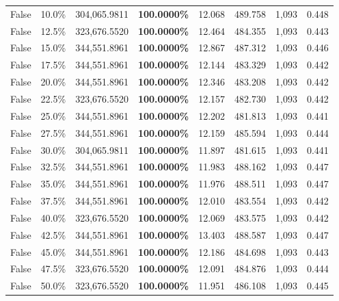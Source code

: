 \begin{table}[H]
\begin{tabular}{lllrllll}
False & 10.0\% & \color{red} 304,065.9811 & \bfseries \color{red} 100.0000\% & 12.068 & 489.758 & 1,093 & 0.448 \\
\cline{1-8}
False & 12.5\% & 323,676.5520 & \bfseries \color{red} 100.0000\% & 12.464 & 484.355 & 1,093 & 0.443 \\
\cline{1-8}
False & 15.0\% & 344,551.8961 & \bfseries \color{red} 100.0000\% & 12.867 & 487.312 & 1,093 & 0.446 \\
\cline{1-8}
False & 17.5\% & 344,551.8961 & \bfseries \color{red} 100.0000\% & 12.144 & 483.329 & 1,093 & 0.442 \\
\cline{1-8}
False & 20.0\% & 344,551.8961 & \bfseries \color{red} 100.0000\% & 12.346 & 483.208 & 1,093 & 0.442 \\
\cline{1-8}
False & 22.5\% & 323,676.5520 & \bfseries \color{red} 100.0000\% & 12.157 & 482.730 & 1,093 & 0.442 \\
\cline{1-8}
False & 25.0\% & 344,551.8961 & \bfseries \color{red} 100.0000\% & 12.202 & 481.813 & 1,093 & 0.441 \\
\cline{1-8}
False & 27.5\% & 344,551.8961 & \bfseries \color{red} 100.0000\% & 12.159 & 485.594 & 1,093 & 0.444 \\
\cline{1-8}
False & 30.0\% & \color{red} 304,065.9811 & \bfseries \color{red} 100.0000\% & 11.897 & 481.615 & 1,093 & 0.441 \\
\cline{1-8}
False & 32.5\% & 344,551.8961 & \bfseries \color{red} 100.0000\% & 11.983 & 488.162 & 1,093 & 0.447 \\
\cline{1-8}
False & 35.0\% & 344,551.8961 & \bfseries \color{red} 100.0000\% & 11.976 & 488.511 & 1,093 & 0.447 \\
\cline{1-8}
False & 37.5\% & 344,551.8961 & \bfseries \color{red} 100.0000\% & 12.010 & 483.554 & 1,093 & 0.442 \\
\cline{1-8}
False & 40.0\% & 323,676.5520 & \bfseries \color{red} 100.0000\% & 12.069 & 483.575 & 1,093 & 0.442 \\
\cline{1-8}
False & 42.5\% & 344,551.8961 & \bfseries \color{red} 100.0000\% & 13.403 & 488.587 & 1,093 & 0.447 \\
\cline{1-8}
False & 45.0\% & 344,551.8961 & \bfseries \color{red} 100.0000\% & 12.186 & 484.698 & 1,093 & 0.443 \\
\cline{1-8}
False & 47.5\% & 323,676.5520 & \bfseries \color{red} 100.0000\% & 12.091 & 484.876 & 1,093 & 0.444 \\
\cline{1-8}
False & 50.0\% & 323,676.5520 & \bfseries \color{red} 100.0000\% & 11.951 & 486.108 & 1,093 & 0.445 \\

\end{tabular}
\end{table}
